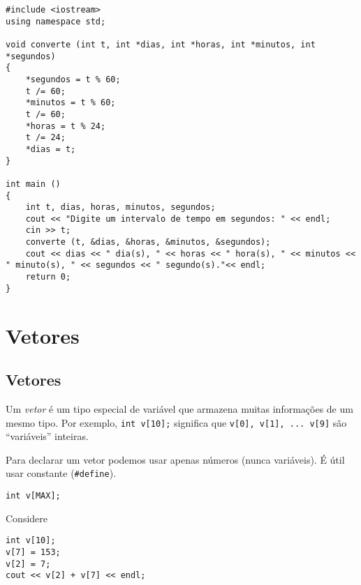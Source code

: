 \documentclass[a4paper]{memoir}
\begin{document}
\begin{sol}
\begin{lstlisting}
#include <iostream>
using namespace std;

void converte (int t, int *dias, int *horas, int *minutos, int *segundos)
{
    *segundos = t % 60;
    t /= 60;
    *minutos = t % 60;
    t /= 60;
    *horas = t % 24;
    t /= 24;
    *dias = t;
}

int main ()
{
    int t, dias, horas, minutos, segundos;
    cout << "Digite um intervalo de tempo em segundos: " << endl;
    cin >> t;
    converte (t, &dias, &horas, &minutos, &segundos);
    cout << dias << " dia(s), " << horas << " hora(s), " << minutos << " minuto(s), " << segundos << " segundo(s)."<< endl;
    return 0;
}
\end{lstlisting}
\end{sol}

\part{Vetores}

\chapter{Vetores}

Um \emph{vetor} é um tipo especial de variável que armazena muitas informações de um mesmo tipo. Por exemplo, \verb|int v[10];| significa que \verb|v[0], v[1], ... v[9]| são ``variáveis'' inteiras.

\begin{center}
\tikzset{every node/.style=draw,minimum height=5mm,minimum width=5mm,node distance=5mm}
\end{center}

Para declarar um vetor podemos usar apenas números (nunca variáveis). É útil usar constante (\verb|#define|).

\verb|int v[MAX];|

\begin{ex}
Considere

\begin{lstlisting}
int v[10];
v[7] = 153;
v[2] = 7;
cout << v[2] + v[7] << endl;
\end{lstlisting}
\end{ex}
\end{document}
